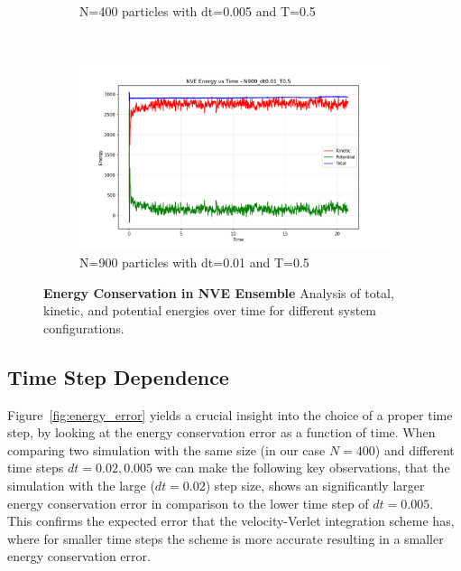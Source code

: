 \begin{figure}[H]
\begin{subfigure}{0.5\textwidth}
		\caption{N=400 particles with dt=0.005 and T=0.5}
		\label{sfig:energy_N400_dt0005}
	\end{subfigure}%
	~
	\begin{subfigure}{0.5\textwidth}
		\includegraphics[width=\textwidth]{media/energy_N900_dt0.01_T0.5.png}
		\caption{N=900 particles with dt=0.01 and T=0.5}
		\label{sfig:energy_N900}
	\end{subfigure}%
	\caption{\textbf{Energy Conservation in NVE Ensemble} 
    Analysis of total, kinetic, and potential energies over time for different system configurations.}
	\label{fig:energy_conservation}
\end{figure}
\subsection{Time Step Dependence}
Figure~\ref{fig:energy_error} yields a crucial insight into the choice of a proper time step, by looking at the energy conservation error as a function of time.
When comparing two simulation with the same size (in our case $N=400$) and different time steps $dt=0.02,0.005$ we can make the following key observations, that the simulation with the large ($dt = 0.02$) step size, shows an significantly larger energy conservation error in comparison to the lower time step of $dt = 0.005$. This confirms the expected error that the velocity-Verlet integration scheme has, where for smaller time steps the scheme is more accurate resulting in a smaller energy conservation error.

